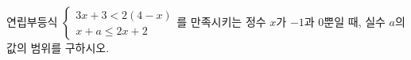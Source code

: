 연립부등식 $\begin{cases} 3x+3<2(4-x) \\ x+a\le 2x+2 \end{cases}$를 만족시키는 정수 $x$가 $-1$과 $0$뿐일 때, 실수 $a$의 값의 범위를 구하시오.
